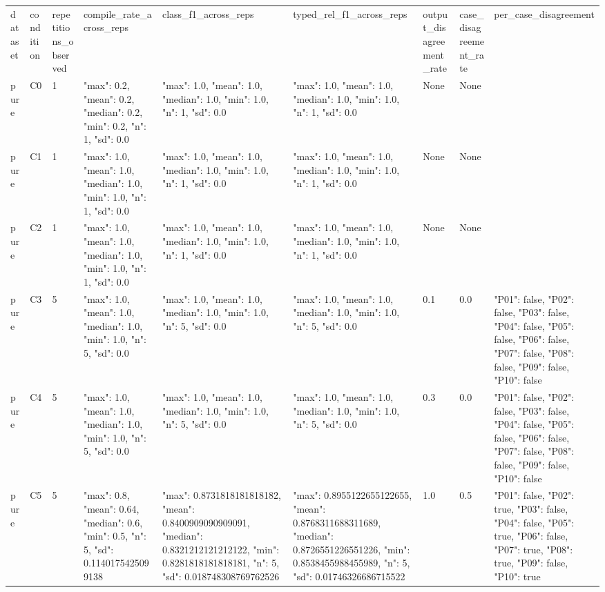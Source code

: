 \begin{tabular}{lllllllll}
dataset & condition & repetitions\_observed & compile\_rate\_across\_reps & class\_f1\_across\_reps & typed\_rel\_f1\_across\_reps & output\_disagreement\_rate & case\_disagreement\_rate & per\_case\_disagreement \\
pure & C0 & 1 & {"max": 0.2, "mean": 0.2, "median": 0.2, "min": 0.2, "n": 1, "sd": 0.0} & {"max": 1.0, "mean": 1.0, "median": 1.0, "min": 1.0, "n": 1, "sd": 0.0} & {"max": 1.0, "mean": 1.0, "median": 1.0, "min": 1.0, "n": 1, "sd": 0.0} & None & None & {} \\
pure & C1 & 1 & {"max": 1.0, "mean": 1.0, "median": 1.0, "min": 1.0, "n": 1, "sd": 0.0} & {"max": 1.0, "mean": 1.0, "median": 1.0, "min": 1.0, "n": 1, "sd": 0.0} & {"max": 1.0, "mean": 1.0, "median": 1.0, "min": 1.0, "n": 1, "sd": 0.0} & None & None & {} \\
pure & C2 & 1 & {"max": 1.0, "mean": 1.0, "median": 1.0, "min": 1.0, "n": 1, "sd": 0.0} & {"max": 1.0, "mean": 1.0, "median": 1.0, "min": 1.0, "n": 1, "sd": 0.0} & {"max": 1.0, "mean": 1.0, "median": 1.0, "min": 1.0, "n": 1, "sd": 0.0} & None & None & {} \\
pure & C3 & 5 & {"max": 1.0, "mean": 1.0, "median": 1.0, "min": 1.0, "n": 5, "sd": 0.0} & {"max": 1.0, "mean": 1.0, "median": 1.0, "min": 1.0, "n": 5, "sd": 0.0} & {"max": 1.0, "mean": 1.0, "median": 1.0, "min": 1.0, "n": 5, "sd": 0.0} & 0.1 & 0.0 & {"P01": false, "P02": false, "P03": false, "P04": false, "P05": false, "P06": false, "P07": false, "P08": false, "P09": false, "P10": false} \\
pure & C4 & 5 & {"max": 1.0, "mean": 1.0, "median": 1.0, "min": 1.0, "n": 5, "sd": 0.0} & {"max": 1.0, "mean": 1.0, "median": 1.0, "min": 1.0, "n": 5, "sd": 0.0} & {"max": 1.0, "mean": 1.0, "median": 1.0, "min": 1.0, "n": 5, "sd": 0.0} & 0.3 & 0.0 & {"P01": false, "P02": false, "P03": false, "P04": false, "P05": false, "P06": false, "P07": false, "P08": false, "P09": false, "P10": false} \\
pure & C5 & 5 & {"max": 0.8, "mean": 0.64, "median": 0.6, "min": 0.5, "n": 5, "sd": 0.1140175425099138} & {"max": 0.8731818181818182, "mean": 0.8400909090909091, "median": 0.8321212121212122, "min": 0.8281818181818181, "n": 5, "sd": 0.018748308769762526} & {"max": 0.8955122655122655, "mean": 0.8768311688311689, "median": 0.8726551226551226, "min": 0.8538455988455989, "n": 5, "sd": 0.01746326686715522} & 1.0 & 0.5 & {"P01": false, "P02": true, "P03": false, "P04": false, "P05": true, "P06": false, "P07": true, "P08": true, "P09": false, "P10": true} \\

\end{tabular}
